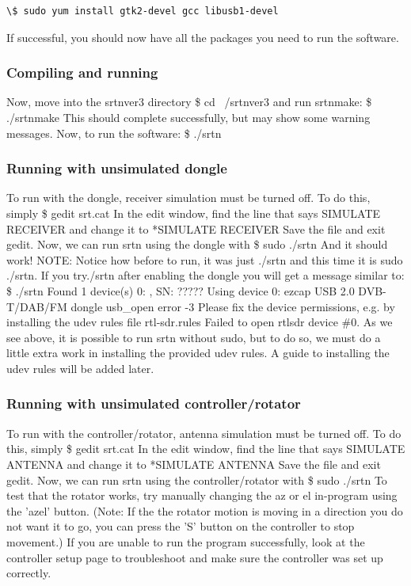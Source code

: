 \documentclass[11pt]{article} %
\begin{document}
\begin{verbatim}
\$ sudo yum install gtk2-devel gcc libusb1-devel
\end{verbatim}

If successful, you should now have all the packages you need to run the software.

\subsubsection{Compiling and running}

Now, move into the srtnver3 directory
\$ cd ~/srtnver3
and run srtnmake:
\$ ./srtnmake
This should complete successfully, but may show some warning messages. Now, to run the software:
\$ ./srtn

\subsubsection{Running with unsimulated dongle}
To run with the dongle, receiver simulation must be turned off. To do this, simply
\$ gedit srt.cat
In the edit window, find the line that says
SIMULATE RECEIVER
and change it to
*SIMULATE RECEIVER
Save the file and exit gedit. Now, we can run srtn using the dongle with
\$ sudo ./srtn
And it should work!
NOTE: Notice how before to run, it was just ./srtn and this time it is sudo ./srtn. If you try./srtn after enabling the dongle you will get a message similar to:
\$ ./srtn
Found 1 device(s)
  0:  ,   SN:  ?????
Using device 0: ezcap USB 2.0 DVB-T/DAB/FM dongle
usb\_open error -3
Please fix the device permissions, e.g. by installing the udev rules file rtl-sdr.rules
Failed to open rtlsdr device \#0.
As we see above, it is possible to run srtn without sudo, but to do so, we must do a little extra work in installing the provided udev rules. A guide to installing the udev rules will be added later.

\subsubsection{Running with unsimulated controller/rotator}
To run with the controller/rotator, antenna simulation must be turned off. To do this, simply
\$ gedit srt.cat
In the edit window, find the line that says
SIMULATE ANTENNA
and change it to
*SIMULATE ANTENNA
Save the file and exit gedit. Now, we can run srtn using the controller/rotator with
\$ sudo ./srtn
To test that the rotator works, try manually changing the az or el in-program using the 'azel' button. (Note: If the the rotator motion is moving in a direction you do not want it to go, you can press the 'S' button on the controller to stop movement.)
If you are unable to run the program successfully, look at the controller setup page to troubleshoot and make sure the controller was set up correctly.
\end{document}
